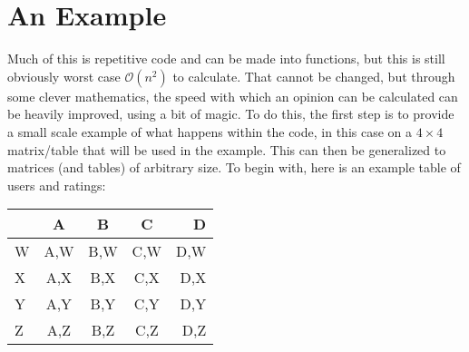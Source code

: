 \documentclass[12pt]{article}
\begin{document}
  \pagebreak
  \section{An Example}
  \indent Much of this is repetitive code and can be made into functions, but this is still obviously worst case $\mathcal{O}(n^2)$ to calculate.  That cannot be changed, but through some clever mathematics, the speed with which an opinion can be calculated can be heavily improved, using a bit of magic.
  \p To do this, the first step is to provide a small scale example of what happens within the code, in this case on a $4\times 4$ matrix/table that will be used in the example.  This can then be generalized to matrices (and tables) of arbitrary size.  To begin with, here is an example table of users and ratings:
  \begin{center}
  \begin{tabular}{|l||c|c|c|r|}
  \hline
  & A & B & C & D \\ \hline \hline
  W & A,W & B,W & C,W & D,W \\ \hline
  X & A,X & B,X & C,X & D,X \\ \hline
  Y & A,Y & B,Y & C,Y & D,Y \\ \hline
  Z & A,Z & B,Z & C,Z & D,Z \\ \hline
  \end{tabular} 
  \end{center}
\end{document}
